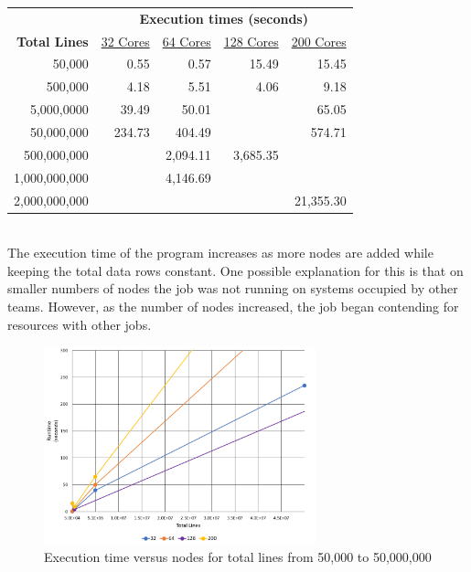 \begin{tabular}{r r r r r}
 & \multicolumn{4}{c}{\textbf{Execution times (seconds)}} \\
\textbf{Total Lines} & \underline{32 Cores} & \underline{64 Cores} & \underline{128 Cores} & \underline{200 Cores} \\
       50,000 &   0.55 &     0.57 &     15.49 & 15.45 \\
      500,000 &   4.18 &     5.51 &      4.06 & 9.18 \\
   5,000,0000 &  39.49 &    50.01 &           & 65.05 \\
   50,000,000 & 234.73 &   404.49 &           & 574.71 \\
  500,000,000 &        & 2,094.11 &  3,685.35 & \\
1,000,000,000 &        & 4,146.69 &           &  \\
2,000,000,000 &        &          &           & 21,355.30 \\ 
\end{tabular} \\

The execution time of the program increases as more nodes are added while keeping the total data rows constant. One possible explanation for this is that on smaller numbers of nodes the job was not running on systems occupied by other teams. However, as the number of nodes increased, the job began contending for resources with other jobs.

\begin{figure}
\centering
\includegraphics[width=0.7\textwidth]{./images/Runtime1.png}
\caption{Execution time versus nodes for total lines from 50,000 to 50,000,000}
\label{fig:lownums}
\end{figure}

